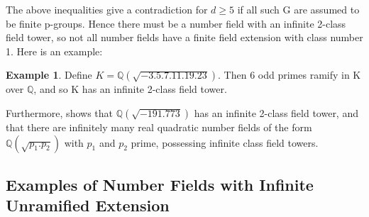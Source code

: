 \documentclass[12pt]{extarticle}
\newcommand{\<}{\langle}
\renewcommand{\>}{\rangle}
\theoremstyle{definition}
\newtheorem*{example}{Example}
\begin{document}
The above inequalities give a contradiction for $d \geq 5$ if all such G are assumed to be finite p-groups. Hence there must be a number field with an infinite 2-class field tower, so not all number fields have a finite field extension with class number 1. Here is an example:
\begin{example}
    Define $K=\mathbb{Q}(\sqrt{-3.5.7.11.19.23})$. Then 6 odd primes ramify in K over $\mathbb{Q}$, and so K has an infinite 2-class field tower. 
\end{example}
Furthermore, \cite{SCHO} shows that $\mathbb{Q}(\sqrt{-191.773})$ has an infinite 2-class field tower, and that there are infinitely many real quadratic number fields of the form $\mathbb{Q}(\sqrt{p_1.p_2})$ with $p_1$ and $p_2$ prime, possessing infinite class field towers. 

\subsection{Examples of Number Fields with Infinite Unramified Extension}
\end{document}
